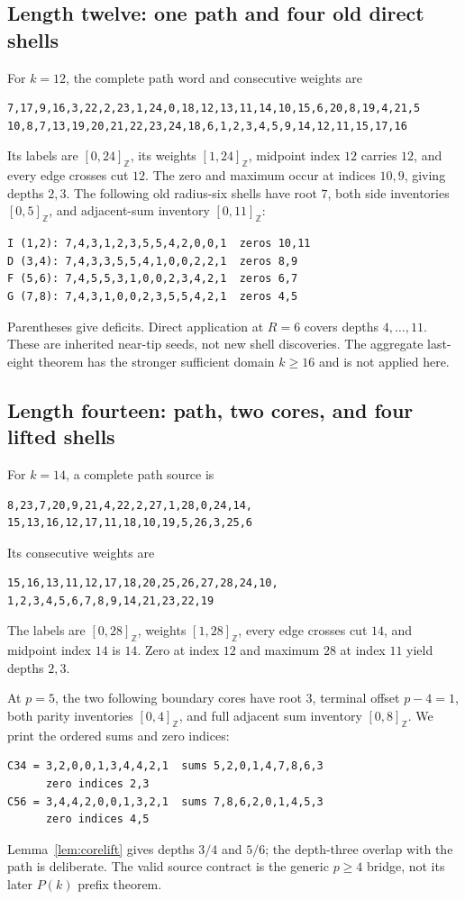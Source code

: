 \documentclass[11pt,a4paper]{article}
\theoremstyle{definition}\newtheorem{definition}[theorem]{Definition}
\theoremstyle{remark}\newtheorem{remark}[theorem]{Remark}
\newcommand{\ints}[2]{[#1,#2]_{\mathbb Z}}
\begin{document}
\subsection{Length twelve: one path and four old direct shells}
For $k=12$, the complete path word and consecutive weights are
\begin{verbatim}
7,17,9,16,3,22,2,23,1,24,0,18,12,13,11,14,10,15,6,20,8,19,4,21,5
10,8,7,13,19,20,21,22,23,24,18,6,1,2,3,4,5,9,14,12,11,15,17,16
\end{verbatim}
Its labels are $\ints0{24}$, its weights $\ints1{24}$, midpoint
index $12$ carries $12$, and every edge crosses cut $12$. The zero
and maximum occur at indices $10,9$, giving depths $2,3$.
The following old radius-six shells have root $7$, both side inventories
$\ints05$, and adjacent-sum inventory $\ints0{11}$:
\begin{verbatim}
I (1,2): 7,4,3,1,2,3,5,5,4,2,0,0,1  zeros 10,11
D (3,4): 7,4,3,3,5,5,4,1,0,0,2,2,1  zeros 8,9
F (5,6): 7,4,5,5,3,1,0,0,2,3,4,2,1  zeros 6,7
G (7,8): 7,4,3,1,0,0,2,3,5,5,4,2,1  zeros 4,5
\end{verbatim}
Parentheses give deficits. Direct application at $R=6$ covers
depths $4,\ldots,11$. These are inherited near-tip seeds, not new
shell discoveries. The aggregate last-eight theorem has the stronger
sufficient domain $k\ge16$ and is not applied here.

\subsection{Length fourteen: path, two cores, and four lifted shells}
For $k=14$, a complete path source is
\begin{verbatim}
8,23,7,20,9,21,4,22,2,27,1,28,0,24,14,
15,13,16,12,17,11,18,10,19,5,26,3,25,6
\end{verbatim}
Its consecutive weights are
\begin{verbatim}
15,16,13,11,12,17,18,20,25,26,27,28,24,10,
1,2,3,4,5,6,7,8,9,14,21,23,22,19
\end{verbatim}
The labels are $\ints0{28}$, weights $\ints1{28}$, every edge
crosses cut $14$, and midpoint index $14$ is $14$. Zero at index
$12$ and maximum $28$ at index $11$ yield depths $2,3$.

At $p=5$, the two following boundary cores have root $3$, terminal
offset $p-4=1$, both parity inventories $\ints04$, and full adjacent
sum inventory $\ints08$. We print the ordered sums and zero indices:
\begin{verbatim}
C34 = 3,2,0,0,1,3,4,4,2,1  sums 5,2,0,1,4,7,8,6,3
      zero indices 2,3
C56 = 3,4,4,2,0,0,1,3,2,1  sums 7,8,6,2,0,1,4,5,3
      zero indices 4,5
\end{verbatim}
Lemma~\ref{lem:corelift} gives depths $3/4$ and $5/6$; the depth-three
overlap with the path is deliberate. The valid source contract is the
generic $p\ge4$ bridge, not its later $P(k)$ prefix theorem.
\end{document}
